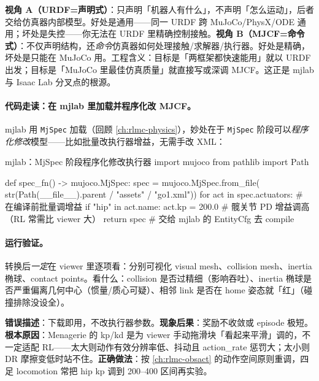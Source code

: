 \begin{insight}\label{ins:rlmc-assets-decl-imp}
\textbf{视角 A（URDF=声明式）}：只声明「机器人有什么」，不声明「怎么运动」，后者交给仿真器内部模型。好处是通用——同一 URDF 跨 MuJoCo/PhysX/ODE 通用；坏处是失控——你无法在 URDF 里精确控制接触。\textbf{视角 B（MJCF=命令式）}：不仅声明结构，还\emph{命令}仿真器如何处理接触/求解器/执行器。好处是精确，坏处是只能在 MuJoCo 用。工程含义：目标是「两框架都快速能用」就以 URDF 出发；目标是「MuJoCo 里最佳仿真质量」就直接写或深调 MJCF。这正是 mjlab 与 Isaac Lab 分叉点的根源。
\end{insight}

\paragraph{代码走读：在 mjlab 里加载并程序化改 MJCF。}mjlab 用 \texttt{MjSpec} 加载（回顾 \cref{ch:rlmc-physics}），妙处在于 \texttt{MjSpec} 阶段可以\emph{程序化修改}模型——比如批量改执行器增益，无需手改 XML：

\begin{codebox}[Python]{mjlab：MjSpec 阶段程序化修改执行器}
import mujoco
from pathlib import Path

def spec_fn() -> mujoco.MjSpec:
    spec = mujoco.MjSpec.from_file(
        str(Path(__file__).parent / "assets" / "go1.xml"))
    for act in spec.actuators:          # 在编译前批量调增益
        if "hip" in act.name:
            act.kp = 200.0              # 髋关节 PD 增益调高（RL 常需比 viewer 大）
    return spec                          # 交给 mjlab 的 EntityCfg 去 compile
\end{codebox}

\paragraph{运行验证。}转换后\emph{一定}在 viewer 里逐项看：分别可视化 visual mesh、collision mesh、inertia 椭球、contact points。看什么：collision 是否过精细（影响吞吐）、inertia 椭球是否严重偏离几何中心（惯量/质心可疑）、相邻 link 是否在 home 姿态就「红」（碰撞排除没设全）。

\begin{pitfall}
\textbf{错误描述}：下载即用，不改执行器参数。\textbf{现象后果}：奖励不收敛或 episode 极短。\textbf{根本原因}：Menagerie 的 kp/kd 是为 viewer 手动拖滑块「看起来平滑」调的，不一定适配 RL——太大则动作有效分辨率低、抖动且 action\_rate 惩罚大；太小则 DR 摩擦变低时站不住。\textbf{正确做法}：按 \cref{ch:rlmc-obsact} 的动作空间原则重调，四足 locomotion 常把 hip kp 调到 200--400 区间再实验。
\end{pitfall}

